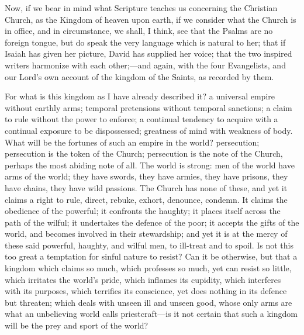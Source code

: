 Now, if we bear in mind what Scripture teaches us concerning the
Christian Church, as the Kingdom of heaven upon earth, if we consider
what the Church is in office, and in circumstance, we shall, I think,
see that the Psalms are no foreign tongue, but do speak the very
language which is natural to her; that if Isaiah has given her
picture, David has supplied her voice; that the two inspired writers
harmonize with each other;—and again, with the four Evangelists, and
our Lord's own account of the kingdom of the Saints, as recorded by
them.

For what is this kingdom as I have already described it? a
universal empire without earthly arms; temporal pretensions without
temporal sanctions; a claim to rule without the power to enforce; a
continual tendency to acquire with a continual exposure to be
dispossessed; greatness of mind with weakness of body. What will be
the fortunes of such an empire in the world? persecution; persecution
is the token of the Church; persecution is the note of the Church,
perhaps the most abiding note of all. The world is strong: men of the
world have arms of the world; they have swords, they have armies, they
have prisons, they have chains, they have wild passions. The Church
has none of these, and yet it claims a right to rule, direct, rebuke,
exhort, denounce, condemn. It claims the obedience of the powerful; it
confronts the haughty; it places itself across the path of the wilful;
it undertakes the defence of the poor; it accepts the gifts of the
world, and becomes involved in their stewardship; and yet it is at the
mercy of these said powerful, haughty, and wilful men, to ill-treat
and to spoil. Is not this too great a temptation for sinful nature to
resist? Can it be otherwise, but that a kingdom which claims so much,
which professes so much, yet can resist so little, which irritates the
world's pride, which inflames its cupidity, which interferes with its
purposes, which terrifies its conscience, yet does nothing in its
defence but threaten; which deals with unseen ill and unseen good,
whose only arms are what an unbelieving world calls priestcraft—is
it not certain that such a kingdom will be the prey and sport of the
world?

